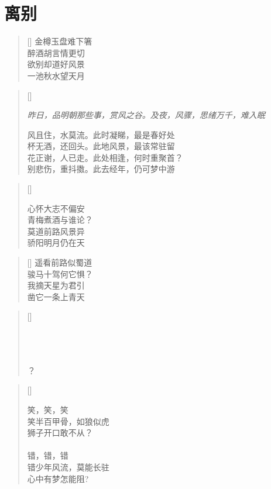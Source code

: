 \chapter{离别}
\thispagestyle{empty}
\renewcommand{\poemtoc}{section}
\settowidth{\versewidth}{秋风不知离别味}
\begin{verse}[\versewidth]
金樽玉盘难下箸\\
醉酒胡言情更切\\
欲别却道好风景\\
一池秋水望天月
\end{verse}

\renewcommand{\poemtoc}{section}
\settowidth{\versewidth}{风且住，水莫流，此时凝睇，最是春好处}
\begin{verse}[\versewidth]

\emph{\scriptsize{昨日，品明朝那些事，赏风之谷。及夜，风骤，思绪万千，难入眠}}

风且住，水莫流。此时凝睇，最是春好处\\
杯无酒，还回头。此地风景，最该常驻留\\
花正谢，人已走。此处相逢，何时重聚首？\\
别悲伤，重抖擞。此去经年，仍可梦中游\\
\end{verse}

\renewcommand{\poemtoc}{section}
\settowidth{\versewidth}{心怀大志不偏安}
\begin{verse}[\versewidth]

心怀大志不偏安\\
青梅煮酒与谁论？\\
莫道前路风景异\\
骄阳明月仍在天
\end{verse}

\renewcommand{\poemtoc}{section}
\settowidth{\versewidth}{心怀大志不偏安}
\begin{verse}[\versewidth]
遥看前路似蜀道\\
骏马十驾何它惧？\\
我摘天星为君引\\
凿它一条上青天
\end{verse}
\newpage

\renewcommand{\poemtoc}{section}
\settowidth{\versewidth}{MOS数载功勋卓}
\begin{verse}[\versewidth]

\\
\\
\\
？
\end{verse}

\renewcommand{\poemtoc}{section}
\settowidth{\versewidth}{MOS数载功勋卓}
\begin{verse}[\versewidth]

笑，笑，笑\\
笑半百甲骨，如狼似虎\\
狮子开口敢不从？\\
~\\
错，错，错\\
错少年风流，莫能长驻\\
心中有梦怎能阻?\\
\end{verse}


